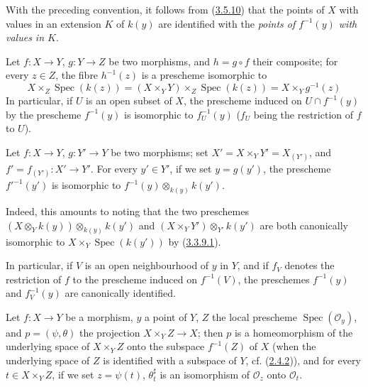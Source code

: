 With the preceding convention, it follows from
(\hyperref[I.3.5.10]{3.5.10}) that the points of $X$ with values in an
extension $K$ of $k(y)$ are identified with the \emph{points of $f^{-1}(y)$
with values in $K$}.

\begin{env}[3.6.3]
\label{I.3.6.3}
Let $f:X\to Y$, $g:Y\to Z$ be two morphisms, and $h=g\circ f$ their composite;
for every $z\in Z$, the fibre $h^{-1}(z)$ is a prescheme isomorphic to
\label{I.3.6.3.fibre-composition}
\[
  X\times_Z\operatorname{Spec}(k(z))
  =(X\times_Y Y)\times_Z\operatorname{Spec}(k(z))
  =X\times_Y g^{-1}(z)
\]
In particular, if $U$ is an open subset of $X$, the prescheme induced on
$U\cap f^{-1}(y)$ by the prescheme $f^{-1}(y)$ is isomorphic to
$f_U^{-1}(y)$ ($f_U$ being the restriction of $f$ to $U$).
\end{env}

\begin{proposition}
\label{I.3.6.4}
Let $f:X\to Y$, $g:Y'\to Y$ be two morphisms; set
$X'=X\times_Y Y'=X_{(Y')}$, and
$f'=f_{(Y')}:X'\to Y'$. For every $y'\in Y'$, if we set $y=g(y')$, the
prescheme $f'^{-1}(y')$ is isomorphic to
$f^{-1}(y)\otimes_{k(y)}k(y')$.
\end{proposition}

Indeed, this amounts to noting that the two preschemes
$(X\otimes_Y k(y))\otimes_{k(y)}k(y')$ and
$(X\times_Y Y')\otimes_{Y'}k(y')$ are both canonically isomorphic to
$X\times_Y\operatorname{Spec}(k(y'))$ by
(\hyperref[I.3.3.9.1]{3.3.9.1}).

In particular, if $V$ is an open neighbourhood of $y$ in $Y$, and if
$f_V$ denotes the restriction of $f$ to the prescheme induced on $f^{-1}(V)$,
the preschemes $f^{-1}(y)$ and $f_V^{-1}(y)$ are canonically identified.

\begin{proposition}[3.6.5]
\label{I.3.6.5}
Let $f:X\to Y$ be a morphism, $y$ a point of $Y$, $Z$ the local prescheme
$\operatorname{Spec}(\mathcal{O}_y)$, and $p=(\psi,\theta)$ the projection
$X\times_Y Z\to X$; then $p$ is a homeomorphism of the underlying space of
$X\times_Y Z$ onto the subspace $f^{-1}(Z)$ of $X$ (when the underlying space
of $Z$ is identified with a subspace of $Y$, cf.
(\hyperref[I.2.4.2]{2.4.2})), and for every $t\in X\times_Y Z$, if we set
$z=\psi(t)$, $\theta_t^\sharp$ is an isomorphism of $\mathcal{O}_z$ onto
$\mathcal{O}_t$.
\end{proposition}

